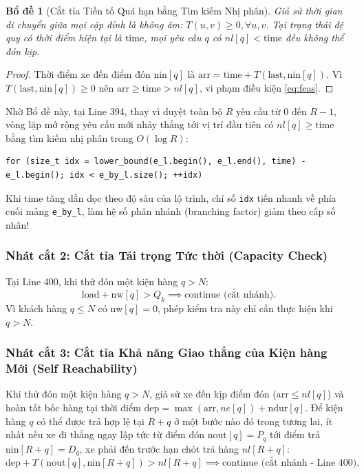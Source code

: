 \documentclass[11pt,a4paper]{article}
\newtheorem{lemma}[theorem]{Bổ đề}
\theoremstyle{definition}
\begin{document}
\begin{lemma}[Cắt tỉa Tiền tố Quá hạn bằng Tìm kiếm Nhị phân]
Giả sử thời gian di chuyển giữa mọi cặp đỉnh là không âm: $T(u, v) \ge 0, \forall u, v$. Tại trạng thái đệ quy có thời điểm hiện tại là $\text{time}$, mọi yêu cầu $q$ có $nl[q] < \text{time}$ đều không thể đón kịp.
\end{lemma}
\begin{proof}
Thời điểm xe đến điểm đón $\text{nin}[q]$ là $\text{arr} = \text{time} + T(\text{last}, \text{nin}[q])$. Vì $T(\text{last}, \text{nin}[q]) \ge 0$ nên $\text{arr} \ge \text{time} > nl[q]$, vi phạm điều kiện \eqref{eq:feas}.
\end{proof}
Nhờ Bổ đề này, tại Line 394, thay vì duyệt toàn bộ $R$ yêu cầu từ $0$ đến $R-1$, vòng lặp mở rộng yêu cầu mới nhảy thẳng tới vị trí đầu tiên có $nl[q] \ge \text{time}$ bằng tìm kiếm nhị phân trong $O(\log R)$:
\begin{lstlisting}
for (size_t idx = lower_bound(e_l.begin(), e_l.end(), time) - e_l.begin(); idx < e_by_l.size(); ++idx)
\end{lstlisting}
Khi $\text{time}$ tăng dần dọc theo độ sâu của lộ trình, chỉ số \texttt{idx} tiến nhanh về phía cuối mảng \texttt{e\_by\_l}, làm hệ số phân nhánh (branching factor) giảm theo cấp số nhân!

\subsubsection{Nhát cắt 2: Cắt tỉa Tải trọng Tức thời (Capacity Check)}
Tại Line 400, khi thử đón một kiện hàng $q > N$:
\[
    \text{load} + \text{nw}[q] > Q_k \implies \text{continue (cắt nhánh).}
\]
Vì khách hàng $q \le N$ có $\text{nw}[q] = 0$, phép kiểm tra này chỉ cần thực hiện khi $q > N$.

\subsubsection{Nhát cắt 3: Cắt tỉa Khả năng Giao thẳng của Kiện hàng Mới (Self Reachability)}
Khi thử đón một kiện hàng $q > N$, giả sử xe đến kịp điểm đón ($\text{arr} \le nl[q]$) và hoàn tất bốc hàng tại thời điểm $\text{dep} = \max(\text{arr}, ne[q]) + \text{ndur}[q]$. Để kiện hàng $q$ có thể được trả hợp lệ tại $R+q$ ở một bước nào đó trong tương lai, ít nhất nếu xe đi thẳng ngay lập tức từ điểm đón $\text{nout}[q] = P_q$ tới điểm trả $\text{nin}[R+q] = D_q$, xe phải đến trước hạn chót trả hàng $nl[R+q]$:
\begin{equation}
    \text{dep} + T(\text{nout}[q], \text{nin}[R+q]) > nl[R+q] \implies \text{continue (cắt nhánh - Line 400).}
\end{equation}
\end{document}

